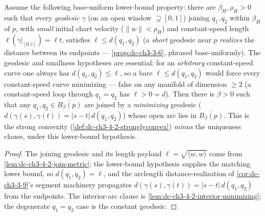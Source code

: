 \begin{lemma}
  \label{lem:dc-ch3-4-2-minimizing-interior}


  Assume the following base-uniform lower-bound property: there are $\beta_H,\rho_H>0$ such that every
  \emph{geodesic} $\gamma$ (on an open window $\supsetneq[0,1]$) joining $q_1,q_2$ within $\beta_H$ of
  $p$, with \emph{small} initial chart velocity ($\|w\|<\rho_H$) and constant-speed length
  $\ell(\gamma|_{[0,t]})=\ell t$, satisfies $\ell\le d(q_1,q_2)$ (a \emph{short} geodesic near $p$
  \emph{realizes} the distance between its endpoints --- \cref{prop:dc-ch3-3-6}, phrased
  base-uniformly). The geodesic and smallness hypotheses are essential: for an \emph{arbitrary}
  constant-speed curve one always has $d(q_1,q_2)\le\ell$, so a bare $\ell\le d(q_1,q_2)$ would force
  every constant-speed curve minimizing --- false on any manifold of dimension $\ge2$ (a constant-speed
  loop through $q_1=q_2$ has $\ell>0=d$). Then there is
  $\beta>0$ such that any $q_1,q_2\in\overline{B_\beta(p)}$ are joined by a \emph{minimizing} geodesic
  ($d(\gamma(s),\gamma(t))=|s-t|\,d(q_1,q_2)$) whose open arc lies in $\overline{B_\beta(p)}$. This is
  the strong convexity (\cref{def:dc-ch3-4-2-stronglyconvex}) \emph{minus} the uniqueness
  clause, under this lower-bound hypothesis.
\end{lemma}
\begin{proof}
  \sketch

  The joining geodesic and its length payload $\ell=\sqrt{\langle w,w\rangle}$ come from
  \cref{lem:dc-ch3-4-2-join-metric}; the lower-bound hypothesis supplies the matching lower bound, so
  $d(q_1,q_2)=\ell$,
  and the arclength distance-realization of \cref{cor:dc-ch3-3-9}'s segment machinery propagates
  $d(\gamma(s),\gamma(t))=|s-t|\,d(q_1,q_2)$ from the endpoints. The interior-arc clause is
  \cref{lem:dc-ch3-4-2-interior-minimizing}; the degenerate $q_1=q_2$ case is the constant geodesic.

\end{proof}

